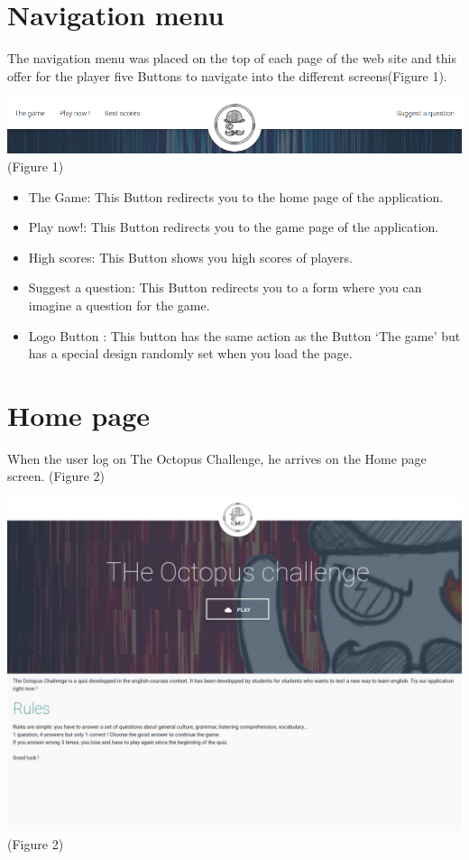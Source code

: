 \documentclass[a4paper,11pt, oneside]{book}
\def\appName{The Octopus Challenge}
\begin{document}
	\section{Navigation menu}
	The navigation menu was placed on the top of each page of the web site and this offer for the player five Buttons to navigate into the different screens(Figure 1).
	
	\begin{center}
	\includegraphics[width=1\textwidth]{CNave.png}
	(Figure 1)
	\end{center}
	\begin{itemize}
		\item The Game: This Button redirects you to the home page of the application.
		\item Play now!: This Button redirects you to the game page of the application.
		\item High scores: This Button shows you high scores of players.
		\item Suggest a question: This Button redirects you to a form where you can imagine a question for the game.
		\item Logo Button : This button has the same action as the Button ‘The game’ but has a special design randomly set when you load the page.
	\end{itemize}

	\section{Home page}
	When the user log on \appName, he arrives on the Home page screen.
(Figure 2)

\begin{center}
	\includegraphics[width=1\textwidth]{CHome.png}
	(Figure 2)
\end{center}
\end{document}
